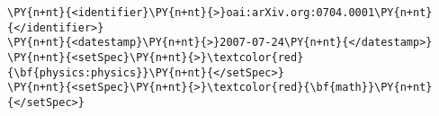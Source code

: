 \begin{Verbatim}[commandchars=\\\{\}, fontsize=\tiny, frame=single]
\PY{n+nt}{<identifier}\PY{n+nt}{>}oai:arXiv.org:0704.0001\PY{n+nt}{</identifier>}
\PY{n+nt}{<datestamp}\PY{n+nt}{>}2007-07-24\PY{n+nt}{</datestamp>}
\PY{n+nt}{<setSpec}\PY{n+nt}{>}\textcolor{red}{\bf{physics:physics}}\PY{n+nt}{</setSpec>}
\PY{n+nt}{<setSpec}\PY{n+nt}{>}\textcolor{red}{\bf{math}}\PY{n+nt}{</setSpec>}
\end{Verbatim}
